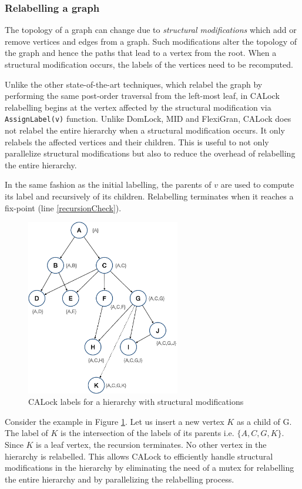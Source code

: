 \subsubsection{Relabelling a graph}

The topology of a graph can change due to \emph{structural modifications} which add or remove vertices and edges from a graph. 
Such modifications alter the topology of the graph and hence the paths that lead to a vertex from the root. 
When a structural modification occurs, the labels of the vertices need to be recomputed.

Unlike the other state-of-the-art techniques, which relabel the graph by performing the same post-order traversal from the left-most leaf, in CALock relabelling begins at the vertex affected by the structural modification via \lstinline|AssignLabel(v)| function. 
Unlike DomLock, MID and FlexiGran, CALock does not relabel the entire hierarchy when a structural modification occurs. 
It only relabels the affected vertices and their children. 
This is useful to not only parallelize structural modifications but also to reduce the overhead of relabelling the entire hierarchy.

In the same fashion as the initial labelling, the parents of $v$ are used to compute its label and recursively of its children. Relabelling terminates when it reaches a fix-point (line \ref{recursionCheck}).  

\begin{figure}[H]
	\centering
	\captionsetup{justification=centering}
	\includegraphics[width=0.6\textwidth]{figures/CALock_example_with_SM.png}
	\caption{CALock labels for a hierarchy with structural modifications}
	\label{fig:CAstructuralModification}
\end{figure}

Consider the example in Figure \ref{fig:CAstructuralModification}. Let us insert a new vertex $K$ as a child of G. The label of $K$ is the intersection of the labels of its parents i.e. $\{A,C,G,K\}$. Since $K$ is a leaf vertex, the recursion terminates. 
No other vertex in the hierarchy is relabelled. 
This allows CALock to efficiently handle structural modifications in the hierarchy by eliminating the need of a mutex for relabelling the entire hierarchy and by parallelizing the relabelling process. 



